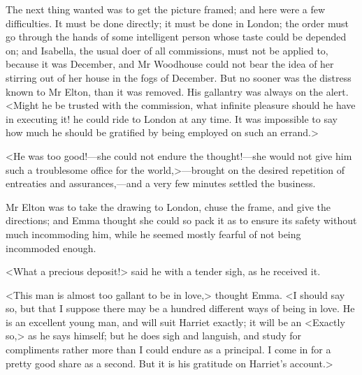 The next thing wanted was to get the picture framed; and here were a few difficulties. It must be done directly; it must be done in London; the order must go through the hands of some intelligent person whose taste could be depended on; and Isabella, the usual doer of all commissions, must not be applied to, because it was December, and Mr Woodhouse could not bear the idea of her stirring out of her house in the fogs of December. But no sooner was the distress known to Mr Elton, than it was removed. His gallantry was always on the alert. <Might he be trusted with the commission, what infinite pleasure should he have in executing it! he could ride to London at any time. It was impossible to say how much he should be gratified by being employed on such an errand.>

<He was too good!—she could not endure the thought!—she would not give him such a troublesome office for the world,>—brought on the desired repetition of entreaties and assurances,—and a very few minutes settled the business.

Mr Elton was to take the drawing to London, chuse the frame, and give the directions; and Emma thought she could so pack it as to ensure its safety without much incommoding him, while he seemed mostly fearful of not being incommoded enough.

<What a precious deposit!> said he with a tender sigh, as he received it.

<This man is almost too gallant to be in love,> thought Emma. <I should say so, but that I suppose there may be a hundred different ways of being in love. He is an excellent young man, and will suit Harriet exactly; it will be an <Exactly so,> as he says himself; but he does sigh and languish, and study for compliments rather more than I could endure as a principal. I come in for a pretty good share as a second. But it is his gratitude on Harriet's account.>